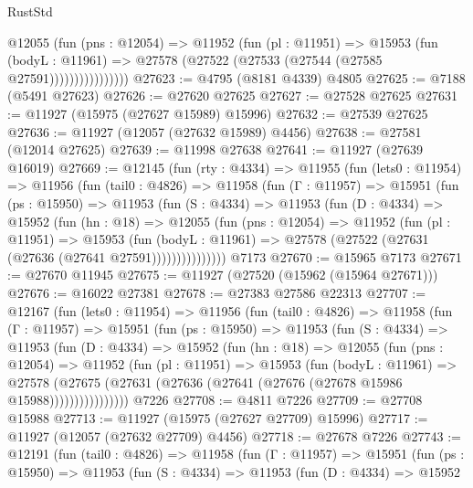 \begin{lexlean}{RustStd}
\begin{coremodule}
                    @12055
                      (fun (pns : @12054) =>
                      @11952
                        (fun (pl : @11951) =>
                        @15953
                          (fun (bodyL : @11961) =>
                          @27578 (@27522 (@27533 (@27544 (@27585 @27591))))))))))))))))
@27623 := @4795 (@8181 @4339) @4805
@27625 := @7188 (@5491 @27623)
@27626 := @27620 @27625
@27627 := @27528 @27625
@27631 := @11927 (@15975 (@27627 @15989) @15996)
@27632 := @27539 @27625
@27636 := @11927 (@12057 (@27632 @15989) @4456)
@27638 := @27581 (@12014 @27625)
@27639 := @11998 @27638
@27641 := @11927 (@27639 @16019)
@27669 := @12145
    (fun (rty : @4334) =>
    @11955
      (fun (lets0 : @11954) =>
      @11956
        (fun (tail0 : @4826) =>
        @11958
          (fun (Γ : @11957) =>
          @15951
            (fun (ps : @15950) =>
            @11953
              (fun (S : @4334) =>
              @11953
                (fun (D : @4334) =>
                @15952
                  (fun (hn : @18) =>
                  @12055
                    (fun (pns : @12054) =>
                    @11952
                      (fun (pl : @11951) =>
                      @15953
                        (fun (bodyL : @11961) =>
                        @27578 (@27522 (@27631 (@27636 (@27641 @27591)))))))))))))))
    @7173
@27670 := @15965 @7173
@27671 := @27670 @11945
@27675 := @11927 (@27520 (@15962 (@15964 @27671)))
@27676 := @16022 @27381
@27678 := @27383 @27586 @22313
@27707 := @12167
    (fun (lets0 : @11954) =>
    @11956
      (fun (tail0 : @4826) =>
      @11958
        (fun (Γ : @11957) =>
        @15951
          (fun (ps : @15950) =>
          @11953
            (fun (S : @4334) =>
            @11953
              (fun (D : @4334) =>
              @15952
                (fun (hn : @18) =>
                @12055
                  (fun (pns : @12054) =>
                  @11952
                    (fun (pl : @11951) =>
                    @15953
                      (fun (bodyL : @11961) =>
                      @27578
                        (@27675
                          (@27631 (@27636 (@27641 (@27676 (@27678 @15986 @15988))))))))))))))))
    @7226
@27708 := @4811 @7226
@27709 := @27708 @15988
@27713 := @11927 (@15975 (@27627 @27709) @15996)
@27717 := @11927 (@12057 (@27632 @27709) @4456)
@27718 := @27678 @7226
@27743 := @12191
    (fun (tail0 : @4826) =>
    @11958
      (fun (Γ : @11957) =>
      @15951
        (fun (ps : @15950) =>
        @11953
          (fun (S : @4334) =>
          @11953
            (fun (D : @4334) =>
            @15952

\end{coremodule}
\end{lexlean}
